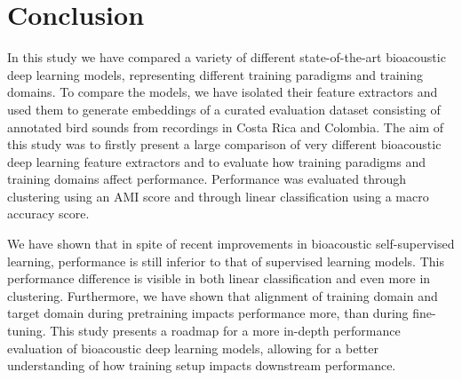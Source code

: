 \section{Conclusion}
\label{sec:conslusion}

In this study we have compared a variety of different state-of-the-art bioacoustic deep learning models, representing different training paradigms and training domains.
To compare the models, we have isolated their feature extractors and used them to generate embeddings of a curated evaluation dataset consisting of annotated bird sounds from recordings in Costa Rica and Colombia.
The aim of this study was to firstly present a large comparison of very different bioacoustic deep learning feature extractors and to evaluate how training paradigms and training domains affect performance.
Performance was evaluated through clustering using an AMI score and through linear classification using a macro accuracy score.

We have shown that in spite of recent improvements in bioacoustic self-supervised learning, performance is still inferior to that of supervised learning models.
This performance difference is visible in both linear classification and even more in clustering.
Furthermore, we have shown that alignment of training domain and target domain during pretraining impacts performance more, than during fine-tuning.
This study presents a roadmap for a more in-depth performance evaluation of bioacoustic deep learning models, allowing for a better understanding of how training setup impacts downstream performance.